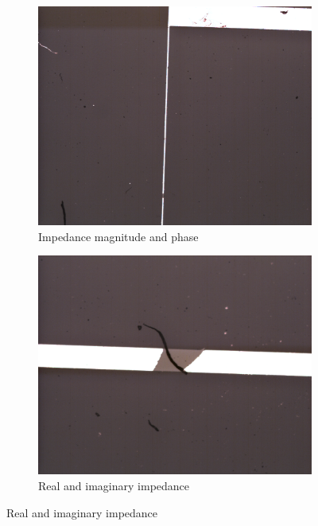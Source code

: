 \begin{figure}[h]
    \centering
    \begin{subfigure}[b]{0.45\textwidth}
        \centering
        \includegraphics[width=\textwidth]{images/electrodeFailureChunkBreak.png}
        \caption{Impedance magnitude and phase}
    \end{subfigure}
    \hfill
    \begin{subfigure}[b]{0.45\textwidth}
        \centering
        \includegraphics[width=\textwidth]{images/electrodeFailureChunkBreakZoomed.png}
        \caption{Real and imaginary impedance}
    \end{subfigure}

\end{figure}
